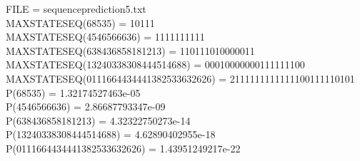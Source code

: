 \documentclass{article}
\begin{document}
\noindent FILE =  sequenceprediction5.txt \\
MAXSTATESEQ(68535) = 10111 \\
MAXSTATESEQ(4546566636) = 1111111111 \\
MAXSTATESEQ(638436858181213) = 110111010000011 \\
MAXSTATESEQ(13240338308444514688) = 00010000000111111100 \\
MAXSTATESEQ(0111664434441382533632626) = 2111111111111100111110101 \\
P(68535) = 1.32174527463e-05  \\
P(4546566636) = 2.86687793347e-09  \\
P(638436858181213) = 4.32322750273e-14  \\
P(13240338308444514688) = 4.62890402955e-18  \\
P(0111664434441382533632626) = 1.43951249217e-22  \\
\end{document}
